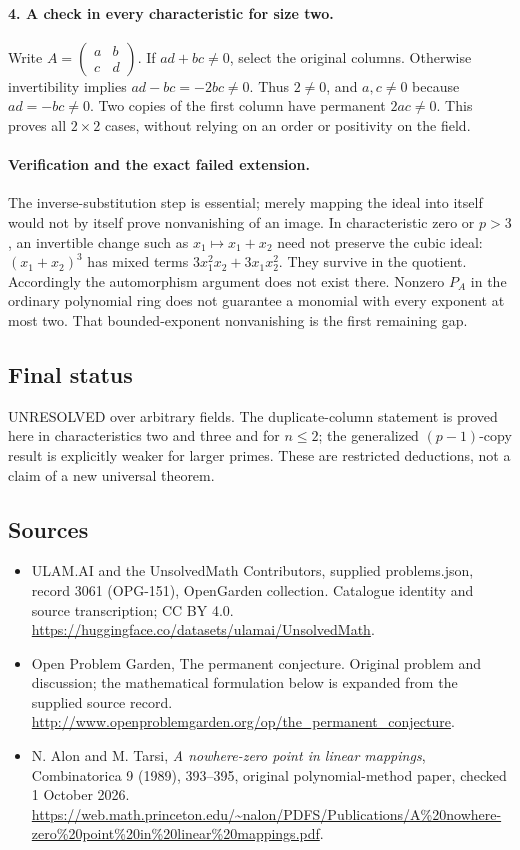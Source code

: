 \documentclass[11pt,a4paper]{article}
\begin{document}
\paragraph{4. A check in every characteristic for size two.}
Write $A=\left(\begin{smallmatrix}a&b\\c&d\end{smallmatrix}\right)$.
If $ad+bc\ne0$, select the original columns. Otherwise invertibility
implies $ad-bc=-2bc\ne0$. Thus $2\ne0$, and $a,c\ne0$ because
$ad=-bc\ne0$. Two copies of the first column have permanent
$2ac\ne0$. This proves all $2\times2$ cases, without relying on
an order or positivity on the field.

\paragraph{Verification and the exact failed extension.}
The inverse-substitution step is essential; merely mapping the ideal
into itself would not by itself prove nonvanishing of an image. In
characteristic zero or $p>3$, an invertible change such as
$x_1\mapsto x_1+x_2$ need not preserve the cubic ideal:
$(x_1+x_2)^3$ has mixed terms $3x_1^2x_2+3x_1x_2^2$.
They survive in the quotient. Accordingly the automorphism argument
does not exist there. Nonzero $P_A$ in the ordinary polynomial ring
does not guarantee a monomial with every exponent at most two.
That bounded-exponent nonvanishing is the first remaining gap.

\subsection{Final status}
UNRESOLVED over arbitrary fields. The duplicate-column statement is
proved here in characteristics two and three and for $n\le2$; the
generalized $(p-1)$-copy result is explicitly weaker for larger primes.
These are restricted deductions, not a claim of a new universal theorem.

\subsection{Sources}
\begin{itemize}
\item[S1] ULAM.AI and the UnsolvedMath Contributors, supplied problems.json, record 3061 (OPG-151), OpenGarden collection. Catalogue identity and source transcription; CC BY 4.0.
\url{https://huggingface.co/datasets/ulamai/UnsolvedMath}.
\item[S2] Open Problem Garden, The permanent conjecture. Original problem and discussion; the mathematical formulation below is expanded from the supplied source record.
\url{http://www.openproblemgarden.org/op/the_permanent_conjecture}.
\item[S3] N. Alon and M. Tarsi, \emph{A nowhere-zero point in linear mappings}, Combinatorica 9 (1989), 393--395, original polynomial-method paper, checked 1 October 2026.
\url{https://web.math.princeton.edu/~nalon/PDFS/Publications/A%20nowhere-zero%20point%20in%20linear%20mappings.pdf}.
\end{itemize}
\end{document}
